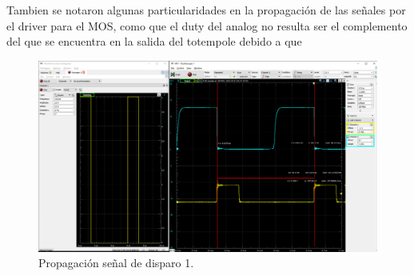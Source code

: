 Tambien se notaron algunas particularidades en la propagación de las señales por el driver para el MOS, como que el duty del analog no resulta ser el complemento del que se encuentra en la salida del totempole debido a que 
\begin{figure}[H]
	\centering
	\includegraphics[width=\linewidth]{Imagenes/V_A_V_emisor_comun}
	\caption{Propagación señal de disparo 1.}
	\label{fig:VAVE1}
\end{figure}

